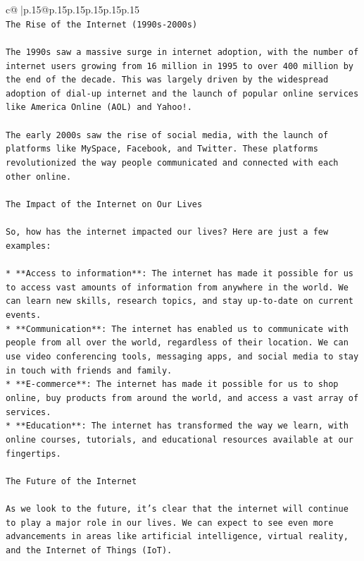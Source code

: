 \documentclass{article}
\begin{document}
{\begin{supertabular}{c@{$\;$}|p{.15\linewidth}@{}p{.15\linewidth}p{.15\linewidth}p{.15\linewidth}p{.15\linewidth}p{.15\linewidth}}
{{{\\ 
\texttt{The Rise of the Internet (1990s{-}2000s)} \\
\\ 
\texttt{The 1990s saw a massive surge in internet adoption, with the number of internet users growing from 16 million in 1995 to over 400 million by the end of the decade. This was largely driven by the widespread adoption of dial{-}up internet and the launch of popular online services like America Online (AOL) and Yahoo!.} \\
\\ 
\texttt{The early 2000s saw the rise of social media, with the launch of platforms like MySpace, Facebook, and Twitter. These platforms revolutionized the way people communicated and connected with each other online.} \\
\\ 
\texttt{The Impact of the Internet on Our Lives} \\
\\ 
\texttt{So, how has the internet impacted our lives? Here are just a few examples:} \\
\\ 
\texttt{* **Access to information**: The internet has made it possible for us to access vast amounts of information from anywhere in the world. We can learn new skills, research topics, and stay up{-}to{-}date on current events.} \\
\texttt{* **Communication**: The internet has enabled us to communicate with people from all over the world, regardless of their location. We can use video conferencing tools, messaging apps, and social media to stay in touch with friends and family.} \\
\texttt{* **E{-}commerce**: The internet has made it possible for us to shop online, buy products from around the world, and access a vast array of services.} \\
\texttt{* **Education**: The internet has transformed the way we learn, with online courses, tutorials, and educational resources available at our fingertips.} \\
\\ 
\texttt{The Future of the Internet} \\
\\ 
\texttt{As we look to the future, it's clear that the internet will continue to play a major role in our lives. We can expect to see even more advancements in areas like artificial intelligence, virtual reality, and the Internet of Things (IoT).} \\
}}}
\end{supertabular}}
\end{document}
